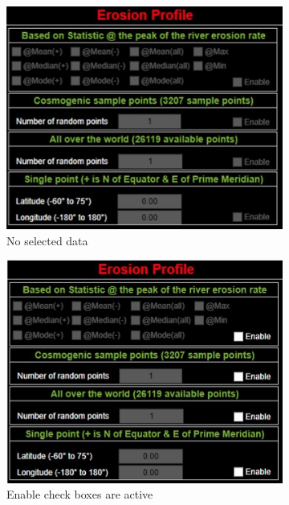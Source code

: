 \documentclass[11pt,a4paper,titlepage]{report}
\begin{document}
\begin{figure}[H]
    \centering
    \begin{subfigure}[H]{0.3\textwidth}
        \includegraphics[width=\textwidth]{ep1.jpg}
        \caption{No selected data}
    \end{subfigure}
    \quad
    \begin{subfigure}[H]{0.3\textwidth}
        \includegraphics[width=\textwidth]{ep2.jpg}
        \caption{Enable check boxes are active}
    \end{subfigure}
    \quad
    \begin{subfigure}[H]{0.3\textwidth}

\end{subfigure}
\end{figure}
\end{document}
